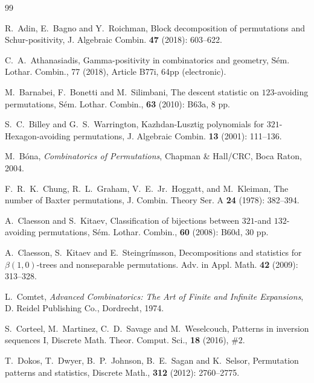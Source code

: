 \documentclass[12pt]{amsart}
\numberwithin{equation}{section}
\theoremstyle{plain}
\theoremstyle{definition}
\begin{document}
\begin{thebibliography}{99}

 R.~Adin, E.~Bagno and Y.~Roichman, Block decomposition of permutations and Schur-positivity, J. Algebraic Combin. {\bf47} (2018): 603--622.

 C.~A.~Athanasiadis, Gamma-positivity in combinatorics and geometry, S\'em. Lothar. Combin., 77 (2018), Article B77i, 64pp (electronic).

 M.~Barnabei, F.~Bonetti and M.~Silimbani, The descent statistic on $123$-avoiding permutations, S\'em. Lothar. Combin., {\bf 63} (2010): B63a, 8 pp.

 S.~C.~Billey and G.~S.~Warrington, Kazhdan-Lusztig polynomials for $321$-Hexagon-avoiding permutations, J. Algebraic Combin. {\bf13} (2001): 111--136.





 M.~B\'ona, {\em Combinatorics of Permutations}, Chapman \& Hall/CRC, Boca Raton, 2004.

 F.~R.~K.~Chung, R.~L.~Graham, V.~E.~Jr.~Hoggatt, and M.~Kleiman,
The number of Baxter permutations, J. Combin. Theory Ser. A {\bf24} (1978): 382--394. 

 A.~Claesson and S.~Kitaev, Classification of bijections between $321$-and $132$-avoiding permutations, S\'em. Lothar. Combin., {\bf 60} (2008): B60d, 30 pp.

 A.~Claesson, S.~Kitaev and E.~Steingr\'imsson,  Decompositions and statistics for $\beta(1,0)$-trees and nonseparable permutations. Adv. in Appl. Math. {\bf42} (2009): 313--328. 

 L.~Comtet, {\em Advanced Combinatorics: The Art of Finite and Infinite Expansions}, D. Reidel Publishing Co., Dordrecht, 1974.

 S.~Corteel, M.~Martinez, C.~D.~Savage and M.~Weselcouch, Patterns in inversion sequences I,  Discrete Math. Theor. Comput. Sci., {\bf18} (2016),  $\#2$.

 T.~Dokos, T.~Dwyer, B.~P.~Johnson, B.~E.~Sagan and K.~Selsor, Permutation patterns and statistics, Discrete Math., {\bf312} (2012): 2760--2775.


\end{thebibliography}
\end{document}
